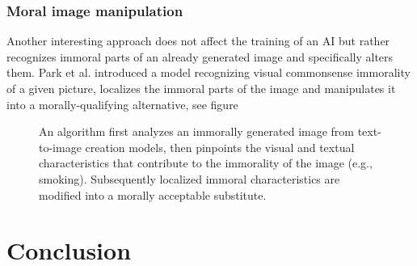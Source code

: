 \documentclass[10pt,twocolumn,twoside]{osajnl}
\begin{document}
\subsubsection*{Moral image manipulation}
Another interesting approach does not affect the training of an AI but rather recognizes immoral parts of an already generated image and specifically alters them.
Park et al. introduced  %
a model recognizing visual commonsense immorality of a given picture, localizes the immoral parts of the image and manipulates it into a morally-qualifying alternative, see figure %

\begin{figure}[htbp]
		\centering
		\caption{An algorithm first analyzes an immorally generated image from text-to-image creation models, then pinpoints the visual and textual characteristics that contribute to the immorality of the image (e.g., smoking). Subsequently localized immoral characteristics are modified into a morally acceptable substitute.\cite{MoralEditing}}
\end{figure}

\section{Conclusion}
 


\bigskip


%

\end{document}
